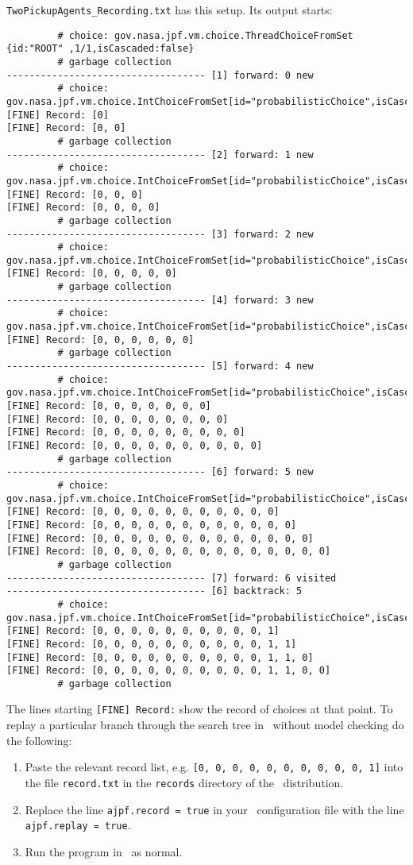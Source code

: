 \texttt{TwoPickupAgents\_Recording.txt} has this setup.  Its output starts:
\begin{verbatim}
		 # choice: gov.nasa.jpf.vm.choice.ThreadChoiceFromSet {id:"ROOT" ,1/1,isCascaded:false}
		 # garbage collection
----------------------------------- [1] forward: 0 new
		 # choice: gov.nasa.jpf.vm.choice.IntChoiceFromSet[id="probabilisticChoice",isCascaded:false,>0,1]
[FINE] Record: [0]
[FINE] Record: [0, 0]
		 # garbage collection
----------------------------------- [2] forward: 1 new
		 # choice: gov.nasa.jpf.vm.choice.IntChoiceFromSet[id="probabilisticChoice",isCascaded:false,>0,1]
[FINE] Record: [0, 0, 0]
[FINE] Record: [0, 0, 0, 0]
		 # garbage collection
----------------------------------- [3] forward: 2 new
		 # choice: gov.nasa.jpf.vm.choice.IntChoiceFromSet[id="probabilisticChoice",isCascaded:false,>0,1]
[FINE] Record: [0, 0, 0, 0, 0]
		 # garbage collection
----------------------------------- [4] forward: 3 new
		 # choice: gov.nasa.jpf.vm.choice.IntChoiceFromSet[id="probabilisticChoice",isCascaded:false,>0,1]
[FINE] Record: [0, 0, 0, 0, 0, 0]
		 # garbage collection
----------------------------------- [5] forward: 4 new
		 # choice: gov.nasa.jpf.vm.choice.IntChoiceFromSet[id="probabilisticChoice",isCascaded:false,>0,1]
[FINE] Record: [0, 0, 0, 0, 0, 0, 0]
[FINE] Record: [0, 0, 0, 0, 0, 0, 0, 0]
[FINE] Record: [0, 0, 0, 0, 0, 0, 0, 0, 0]
[FINE] Record: [0, 0, 0, 0, 0, 0, 0, 0, 0, 0]
		 # garbage collection
----------------------------------- [6] forward: 5 new
		 # choice: gov.nasa.jpf.vm.choice.IntChoiceFromSet[id="probabilisticChoice",isCascaded:false,>0,1]
[FINE] Record: [0, 0, 0, 0, 0, 0, 0, 0, 0, 0, 0]
[FINE] Record: [0, 0, 0, 0, 0, 0, 0, 0, 0, 0, 0, 0]
[FINE] Record: [0, 0, 0, 0, 0, 0, 0, 0, 0, 0, 0, 0, 0]
[FINE] Record: [0, 0, 0, 0, 0, 0, 0, 0, 0, 0, 0, 0, 0, 0]
		 # garbage collection
----------------------------------- [7] forward: 6 visited
----------------------------------- [6] backtrack: 5
		 # choice: gov.nasa.jpf.vm.choice.IntChoiceFromSet[id="probabilisticChoice",isCascaded:false,0,>1]
[FINE] Record: [0, 0, 0, 0, 0, 0, 0, 0, 0, 0, 1]
[FINE] Record: [0, 0, 0, 0, 0, 0, 0, 0, 0, 0, 1, 1]
[FINE] Record: [0, 0, 0, 0, 0, 0, 0, 0, 0, 0, 1, 1, 0]
[FINE] Record: [0, 0, 0, 0, 0, 0, 0, 0, 0, 0, 1, 1, 0, 0]
		 # garbage collection
\end{verbatim}
The lines starting \texttt{[FINE] Record:} show the record of choices at that point.  To replay a particular branch through the search tree in \ail\ without model checking do the following:
\begin{enumerate}
\item Paste the relevant record list, e.g. \texttt{[0, 0, 0, 0, 0, 0, 0, 0, 0, 0, 1]} into the file \texttt{record.txt} in the \texttt{records} directory of the \mcapl\ distribution.
\item Replace the line \texttt{ajpf.record = true} in your \ail\ configuration file with the line \texttt{ajpf.replay = true}.  
\item Run the program in \ail\ as normal.
\end{enumerate}

